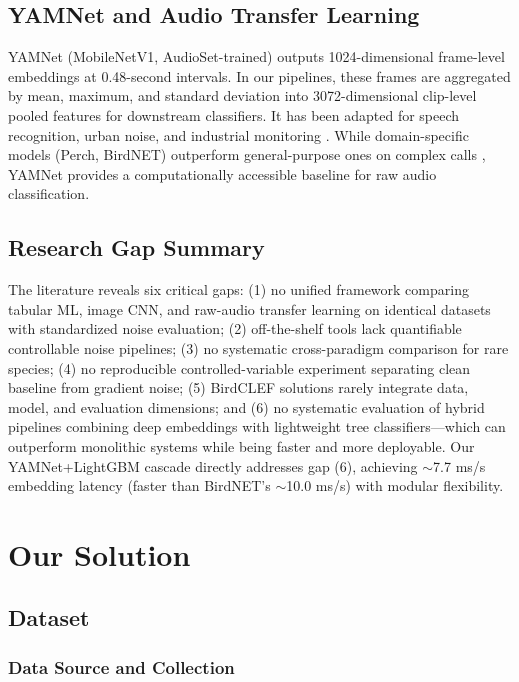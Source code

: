 \documentclass[conference]{IEEEtran}
\begin{document}
\subsection{YAMNet and Audio Transfer Learning}

YAMNet \cite{hershey2017cnn, gemmeke2017audio} (MobileNetV1, AudioSet-trained) outputs 1024-dimensional frame-level embeddings at 0.48-second intervals. In our pipelines, these frames are aggregated by mean, maximum, and standard deviation into 3072-dimensional clip-level pooled features for downstream classifiers. It has been adapted for speech recognition, urban noise, and industrial monitoring \cite{yamnet2025transfer}. While domain-specific models (Perch, BirdNET) outperform general-purpose ones on complex calls \cite{ghani2023global, vggish}, YAMNet provides a computationally accessible baseline for raw audio classification.

\subsection{Research Gap Summary}

The literature reveals six critical gaps: (1) no unified framework comparing tabular ML, image CNN, and raw-audio transfer learning on identical datasets with standardized noise evaluation; (2) off-the-shelf tools lack quantifiable controllable noise pipelines; (3) no systematic cross-paradigm comparison for rare species; (4) no reproducible controlled-variable experiment separating clean baseline from gradient noise; (5) BirdCLEF solutions rarely integrate data, model, and evaluation dimensions; and (6) no systematic evaluation of hybrid pipelines combining deep embeddings with lightweight tree classifiers—which can outperform monolithic systems while being faster and more deployable. Our YAMNet+LightGBM cascade directly addresses gap (6), achieving $\sim$7.7 ms/s embedding latency (faster than BirdNET's $\sim$10.0 ms/s) with modular flexibility.


\section{Our Solution}

\subsection{Dataset}

\subsubsection{Data Source and Collection}
\end{document}
